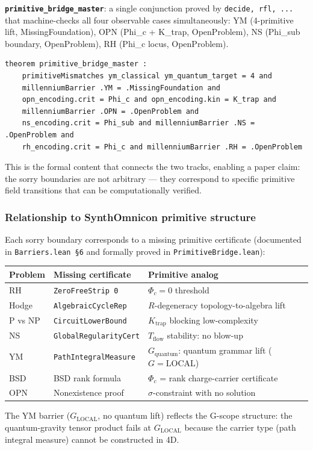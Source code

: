 \documentclass[11pt,a4paper]{article}
\begin{document}
\textbf{\texttt{primitive\_bridge\_master}}: a single conjunction proved by \texttt{\langleby decide, rfl, ...\rangle} that machine-checks all four observable cases simultaneously: YM (4-primitive lift, MissingFoundation), OPN (Phi\_c + K\_trap, OpenProblem), NS (Phi\_sub boundary, OpenProblem), RH (Phi\_c locus, OpenProblem).

\begin{lstlisting}[language=lean]
theorem primitive_bridge_master :
    primitiveMismatches ym_classical ym_quantum_target = 4 and
    millenniumBarrier .YM = .MissingFoundation and
    opn_encoding.crit = Phi_c and opn_encoding.kin = K_trap and
    millenniumBarrier .OPN = .OpenProblem and
    ns_encoding.crit = Phi_sub and millenniumBarrier .NS = .OpenProblem and
    rh_encoding.crit = Phi_c and millenniumBarrier .RH = .OpenProblem
\end{lstlisting}

This is the formal content that connects the two tracks, enabling a paper claim: the sorry boundaries are not arbitrary --- they correspond to specific primitive field transitions that can be computationally verified.

\subsubsection{Relationship to SynthOmnicon primitive structure}

Each sorry boundary corresponds to a missing primitive certificate (documented in \texttt{Barriers.lean §6} and formally proved in \texttt{PrimitiveBridge.lean}):

\begin{table}[htbp]
\centering
\small
{}
\begin{tabularx}{\textwidth}{>{\centering\arraybackslash}X >{\centering\arraybackslash}X >{\centering\arraybackslash}X}
\toprule
\rowcolor{gray!25}\textbf{Problem} & \textbf{Missing certificate} & \textbf{Primitive analog} \\
\midrule
\rowcolors{1}{white}{gray!10}
RH & \texttt{ZeroFreeStrip 0} & $\Phi_c = 0$ threshold \\
Hodge & \texttt{AlgebraicCycleRep} & $R$-degeneracy topology-to-algebra lift \\
P vs NP & \texttt{CircuitLowerBound} & $K_\text{trap}$ blocking low-complexity \\
NS & \texttt{GlobalRegularityCert} & $T_\text{flow}$ stability: no blow-up \\
YM & \texttt{PathIntegralMeasure} & $G_\text{quantum}$: quantum grammar lift ($G = \text{LOCAL}$) \\
BSD & BSD rank formula & $\Phi_c$ = rank charge-carrier certificate \\
OPN & Nonexistence proof & $\sigma$-constraint with no solution \\
\bottomrule
\end{tabularx}
\end{table}

The YM barrier ($G_\text{LOCAL}$, no quantum lift) reflects the G-scope structure: the quantum-gravity tensor product fails at $G_\text{LOCAL}$ because the carrier type (path integral measure) cannot be constructed in 4D.
\end{document}
